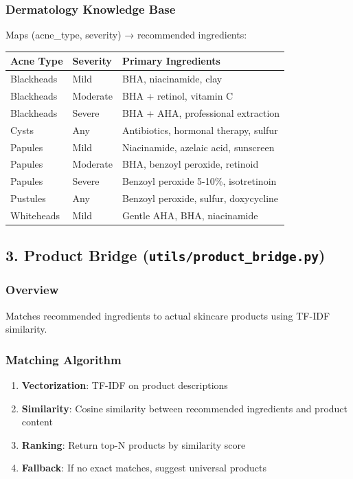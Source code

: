 \documentclass[12pt,a4paper]{article}
\begin{document}
\subsubsection{Dermatology Knowledge Base}

Maps (acne\_type, severity) → recommended ingredients:

\begin{center}
\begin{tabular}{|l|l|l|}
\hline
\textbf{Acne Type} & \textbf{Severity} & \textbf{Primary Ingredients} \\
\hline
Blackheads & Mild & BHA, niacinamide, clay \\
Blackheads & Moderate & BHA + retinol, vitamin C \\
Blackheads & Severe & BHA + AHA, professional extraction \\
\hline
Cysts & Any & Antibiotics, hormonal therapy, sulfur \\
\hline
Papules & Mild & Niacinamide, azelaic acid, sunscreen \\
Papules & Moderate & BHA, benzoyl peroxide, retinoid \\
Papules & Severe & Benzoyl peroxide 5-10\%, isotretinoin \\
\hline
Pustules & Any & Benzoyl peroxide, sulfur, doxycycline \\
\hline
Whiteheads & Mild & Gentle AHA, BHA, niacinamide \\
\hline
\end{tabular}
\end{center}

\subsection{3. Product Bridge (\texttt{utils/product\_bridge.py})}

\subsubsection{Overview}
Matches recommended ingredients to actual skincare products using TF-IDF similarity.

\subsubsection{Matching Algorithm}

\begin{enumerate}
    \item \textbf{Vectorization}: TF-IDF on product descriptions
    \item \textbf{Similarity}: Cosine similarity between recommended ingredients and product content
    \item \textbf{Ranking}: Return top-N products by similarity score
    \item \textbf{Fallback}: If no exact matches, suggest universal products
\end{enumerate}
\end{document}
